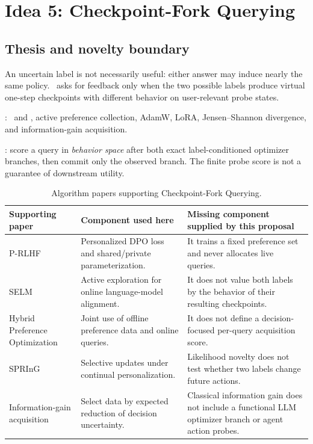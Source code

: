 \section{Idea 5: Checkpoint-Fork Querying}
\label{sec:checkpoint-fork}

\subsection{Thesis and novelty boundary}

An uncertain label is not necessarily useful: either answer may induce nearly
the same policy.  \forkquery\ asks for feedback only when the two possible
labels produce virtual one-step checkpoints with different behavior on
user-relevant probe states.

\Inherited: \prlhf\ and \pdpo, active preference collection, AdamW, LoRA,
Jensen--Shannon divergence, and information-gain acquisition.

\Proposed: score a query in \emph{behavior space} after both exact
label-conditioned optimizer branches, then commit only the observed branch.
The finite probe score is not a guarantee of downstream utility.

\begin{table}[t]
  \centering
  \caption{Algorithm papers supporting Checkpoint-Fork Querying.}
  \label{tab:fork-support}
  \begin{tabularx}{\textwidth}{@{}L{0.24\textwidth}Y Y@{}}
    \toprule
    Supporting paper & Component used here & Missing component supplied by this proposal \\
    \midrule
    P-RLHF \citep{li2024personalized} &
    Personalized DPO loss and shared/private parameterization. &
    It trains a fixed preference set and never allocates live queries. \\
    SELM \citep{zhang2024selm} &
    Active exploration for online language-model alignment. &
    It does not value both labels by the behavior of their resulting
    checkpoints. \\
    Hybrid Preference Optimization \citep{bose2024hybrid} &
    Joint use of offline preference data and online queries. &
    It does not define a decision-focused per-query acquisition score. \\
    SPRInG \citep{kim2026spring} &
    Selective updates under continual personalization. &
    Likelihood novelty does not test whether two labels change future actions. \\
    Information-gain acquisition \citep{mackay1992information} &
    Select data by expected reduction of decision uncertainty. &
    Classical information gain does not include a functional LLM optimizer
    branch or agent action probes. \\
    \bottomrule
  \end{tabularx}
\end{table}

